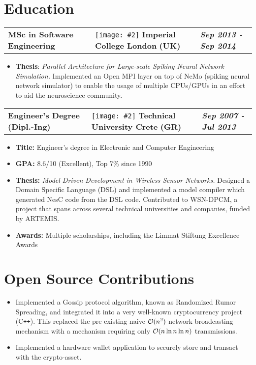 \documentclass[a4paper,10pt]{article}
\DeclareRobustCommand{\bigO}{%
  \text{\usefont{OMS}{cmsy}{m}{n}O}%
}
\newcommand*{\mahogany}{\textcolor{Mahogany}}
\newcommand{\jobtitle}[5]{
\vspace{0.1cm}
\begin{tabularx}
{\textwidth}
{ >{\raggedright\arraybackslash}p{6cm} 
  >{\raggedright\arraybackslash}X 
  >{\raggedleft\arraybackslash}p{4cm} }
\large\textbf{#1} & 
\texttt{[image: \#2]} \large\textbf{\mahogany{#3}} \normalsize\textbf{(#4)} & 
\textit{\large\textbf{#5}}
\end{tabularx}
\vspace{-0.4cm}
}
\begin{document}
\section{Education}
\jobtitle{MSc in Software Engineering}{icons/icl.png}{Imperial College London}{UK}{Sep 2013 - Sep 2014}
\begin{itemize}[leftmargin=.27in,label=] \setlength\itemsep{0cm}
\item \normalsize \textbf{Thesis}: \textit{Parallel Architecture for Large-scale Spiking Neural Network Simulation.} Implemented an Open MPI layer on top of NeMo (spiking neural network simulator) to enable the usage of multiple CPUs/GPUs in an effort to aid the neuroscience community.

\end{itemize}

\vspace{0.2cm}
\jobtitle{Engineer's Degree (Dipl.-Ing)}{icons/tuc.png}{Technical University Crete}{GR}{Sep 2007 - Jul 2013}
\begin{itemize}[leftmargin=.27in,label=]\setlength\itemsep{-0.1cm}
\item \textbf{Title:} Engineer's degree in Electronic and Computer Engineering

\item\textbf{GPA:} 8.6/10 (Excellent), Top 7\% since 1990

\item \textbf{Thesis:} \textit{Model Driven Development in Wireless Sensor Networks.}  Designed a Domain Specific Language (DSL) and implemented a model compiler which generated NesC code from the DSL code. Contributed to WSN-DPCM, a project that spans across several technical universities and companies, funded by ARTEMIS.

\item \textbf{Awards:} Multiple scholarships, including the Limmat Stiftung Excellence Awards

\end{itemize}	

\section{Open Source Contributions}
\vspace{0.2cm}
\begin{itemize}[leftmargin=.27in,label=] 
\setlength\itemsep{-0.1cm}
\item Implemented a Gossip protocol algorithm, known as Randomized Rumor Spreading, and integrated it into a very well-known cryptocurrency project \textsc{(C\texttt{++})}. This replaced the pre-existing naive $\bigO(n^2)$ network broadcasting mechanism with a mechanism requiring only $\bigO(n\ln n\ln n)$ transmissions.
\item Implemented a hardware wallet application to securely store and transact with the crypto-asset.
\end{itemize}
\end{document}
